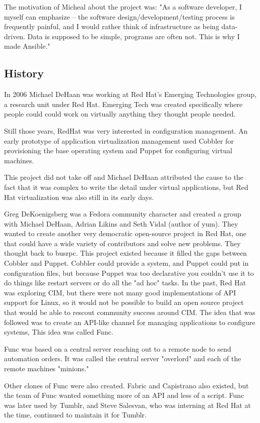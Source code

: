 \documentclass[12pt,a4paper,openright,twoside]{book}
\begin{document}
The motivation of Micheal about the project was:
"As a software developer, I myself can emphasize -- the software design/development/testing process is frequently painful, and I would rather think of infrastructure as being data-driven. Data is supposed to be simple, programs are often not. This is why I made Ansible."

\subsection{History}
In 2006 Michael DeHaan was working at Red Hat's Emerging Technologies group, a research unit under Red Hat. Emerging Tech was created specifically where people could could work on virtually anything they thought people needed.

Still those years, RedHat was very interested in configuration management. An early prototype of application virtualization management used Cobbler for provisioning the base operating system and Puppet for configuring virtual machines.

This project did not take off and Michael DeHaan attributed the cause to the fact that it was complex to write the detail under virtual applications, but Red Hat virtualization was also still in its early days.

Greg DeKoenigsberg was a Fedora community character and created a group with Michael DeHaan, Adrian Likins and Seth Vidal (author of yum). They wanted to create another very democratic open-source project in Red Hat, one that could have a wide variety of contributors and solve new problems. They thought back to busrpc. This project existed because it filled the gaps between Cobbler and Puppet. Cobbler could provide a system, and Puppet could put in configuration files, but because Puppet was too declarative you couldn't use it to do things like restart servers or do all the "ad hoc" tasks. In the past, Red Hat was exploring CIM, but there were not many good implementations of API support for Linux, so it would not be possible to build an open source project that would be able to rescout community success around CIM. The idea that was followed was to create an API-like channel for managing applications to configure systems, This idea was called Func.

Func was based on a central server reaching out to a remote node to send automation orders. It was called the central server "overlord" and each of the remote machines "minions." 

Other clones of Func were also created. Fabric and Capistrano also existed, but the team of Func wanted something more of an API and less of a script. Func was later used by Tumblr, and Steve Salesvan, who was interning at Red Hat at the time, continued to maintain it for Tumblr.
\end{document}
